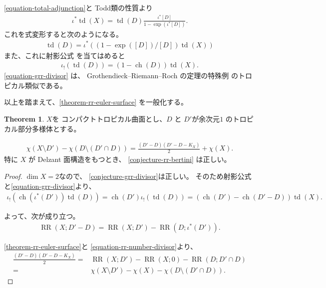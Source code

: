 \documentclass[a4paper,dvipdfmx,reqno,12pt]{amsart}
\theoremstyle{definition}
\newtheorem{theorem}{Theorem}[section]
\newcommand{\opn}[1]{\operatorname{#1}}
\numberwithin{equation}{section}
\begin{document}
\eqref{equation-total-adjunction}と
Todd類の性質より
\begin{align}
\iota^{*}\opn{td}(X)=
\opn{td}(D)\frac{\iota^{*}[D]}{1-\opn{exp}(\iota^{*}[D])}.
\end{align}
これを式変形すると次のようになる。
\begin{align}
\opn{td}(D)
=\iota^{*}((1-\opn{exp}([D])/[D])\opn{td}(X))
\end{align}
また、これに射影公式
\cite[Proposition 4.18]{gross2019sheaftheoretic}
を当てはめると
\begin{align}
\label{equation-grr-divisor}
\iota_!(\opn{td}(D))=(1-\opn{ch}(D))\opn{td}(X).
\end{align}
\eqref{equation-grr-divisor} は、
Grothendieck--Riemann--Roch の定理の特殊例
のトロピカル類似である。

以上を踏まえて、\cref{theorem-rr-euler-surface}
を一般化する。

\begin{theorem}
\label{theorem-rr-bertini-surface}
$X$を
コンパクトトロピカル曲面とし、$D$ と $D'$が余次元$1$
のトロピカル部分多様体とする。

\begin{align}
\chi(X\setminus D')-\chi(D\setminus (D'\cap D))
=\frac{(D'-D)(D'-D-K_X)}{2}+\chi(X).
\end{align}
特に $X$ が Delzant 面構造をもつとき、
\cref{conjecture-rr-bertini} は正しい。
\end{theorem}

\begin{proof}
$\dim X=2$なので、
\cref{conjecture-grr-divisor}は正しい。
そのため射影公式と\eqref{equation-grr-divisor}より、
\begin{align}
\iota_!(\opn{ch}(\iota^{*}(D'))\opn{td}(D))
=\opn{ch}(D')\iota_!(\opn{td}(D))
=(\opn{ch}(D')-\opn{ch}(D'-D))\opn{td}(X).
\end{align}

よって、次が成り立つ。
\begin{align}
\label{equation-rr-number-divisor}
\opn{RR}(X;D'-D)=\opn{RR}(X;D')-
\opn{RR}(D;\iota^{*}(D')).
\end{align}

\cref{theorem-rr-euler-surface}と
\eqref{equation-rr-number-divisor}より、
\begin{align}
\frac{(D'-D)(D'-D-K_X)}{2}=&
\opn{RR}(X;D')-\opn{RR}(X;0)-
\opn{RR}(D;D'\cap D) \\
=&\chi(X\setminus D')-\chi(X)-\chi(D\setminus (D'\cap D)).
\end{align}
\end{proof}
\end{document}
